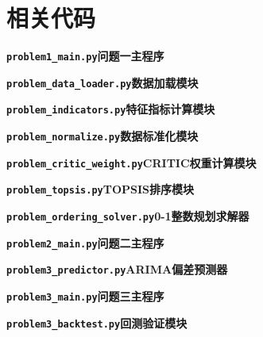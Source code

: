 \documentclass[12pt,a4paper]{ctexart}
\newcommand{\codefile}[3]{%
  \par\vspace{1.2em}\noindent
  \textbf{\texttt{#1}}\quad \textbf{#2}\par
  \vspace{0.4em}
  
  \vspace{0.5em}
}
\theoremstyle{definition}
\theoremstyle{plain}
\theoremstyle{remark}
\begin{document}
\section{相关代码}

\codefile{problem1\_main.py}{问题一主程序}{./code/problem1_main.py}

\codefile{problem\_data\_loader.py}{数据加载模块}{./code/problem_data_loader.py}

\codefile{problem\_indicators.py}{特征指标计算模块}{./code/problem_indicators.py}

\codefile{problem\_normalize.py}{数据标准化模块}{./code/problem_normalize.py}

\codefile{problem\_critic\_weight.py}{CRITIC权重计算模块}{./code/problem_critic_weight.py}

\codefile{problem\_topsis.py}{TOPSIS排序模块}{./code/problem_topsis.py}

\codefile{problem\_ordering\_solver.py}{0-1整数规划求解器}{./code/problem_ordering_solver.py}

\codefile{problem2\_main.py}{问题二主程序}{./code/problem2_main.py}

\codefile{problem3\_predictor.py}{ARIMA偏差预测器}{./code/problem3_predictor.py}

\codefile{problem3\_main.py}{问题三主程序}{./code/problem3_main.py}

\codefile{problem3\_backtest.py}{回测验证模块}{./code/problem3_backtest.py}
\end{document}
